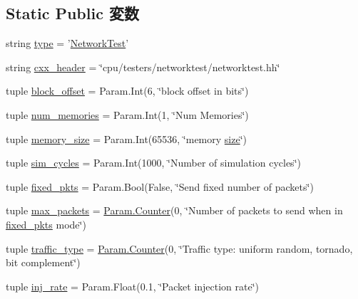 \subsection*{Static Public 変数}
\begin{DoxyCompactItemize}
\item 
string \hyperlink{classNetworkTest_1_1NetworkTest_acce15679d830831b0bbe8ebc2a60b2ca}{type} = '\hyperlink{classNetworkTest_1_1NetworkTest}{NetworkTest}'
\item 
string \hyperlink{classNetworkTest_1_1NetworkTest_a17da7064bc5c518791f0c891eff05fda}{cxx\_\-header} = \char`\"{}cpu/testers/networktest/networktest.hh\char`\"{}
\item 
tuple \hyperlink{classNetworkTest_1_1NetworkTest_a409a77a19be8842873206523fe8888e2}{block\_\-offset} = Param.Int(6, \char`\"{}block offset in bits\char`\"{})
\item 
tuple \hyperlink{classNetworkTest_1_1NetworkTest_ab844715b7a1585b16c9c91cb4dfda459}{num\_\-memories} = Param.Int(1, \char`\"{}Num Memories\char`\"{})
\item 
tuple \hyperlink{classNetworkTest_1_1NetworkTest_a1cf2f09c6d685e8208dc29b8d059c7ae}{memory\_\-size} = Param.Int(65536, \char`\"{}memory \hyperlink{classNetworkTest_a245260f6f74972558f61b85227df5aae}{size}\char`\"{})
\item 
tuple \hyperlink{classNetworkTest_1_1NetworkTest_a78445cebdcbe44397ffa62b323c2da98}{sim\_\-cycles} = Param.Int(1000, \char`\"{}Number of simulation cycles\char`\"{})
\item 
tuple \hyperlink{classNetworkTest_1_1NetworkTest_a566d9159b2e5fa3130f5f62aabeb7915}{fixed\_\-pkts} = Param.Bool(False, \char`\"{}Send fixed number of packets\char`\"{})
\item 
tuple \hyperlink{classNetworkTest_1_1NetworkTest_a7896be157fa4c5c1636e7819cae0f2cc}{max\_\-packets} = \hyperlink{base_2types_8hh_ae1475755791765b8e6f6a8bb091e273e}{Param.Counter}(0, \char`\"{}Number of packets to send when in \hyperlink{classNetworkTest_1_1NetworkTest_a566d9159b2e5fa3130f5f62aabeb7915}{fixed\_\-pkts} mode\char`\"{})
\item 
tuple \hyperlink{classNetworkTest_1_1NetworkTest_a4f8761a54993f21e9ab9312bebac059b}{traffic\_\-type} = \hyperlink{base_2types_8hh_ae1475755791765b8e6f6a8bb091e273e}{Param.Counter}(0, \char`\"{}Traffic type: uniform random, tornado, bit complement\char`\"{})
\item 
tuple \hyperlink{classNetworkTest_1_1NetworkTest_ae679ac2a8d1c109f4d2e37e447c4ebb5}{inj\_\-rate} = Param.Float(0.1, \char`\"{}Packet injection rate\char`\"{})

\end{DoxyCompactItemize}
